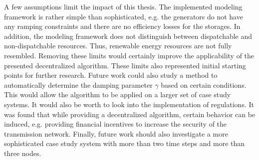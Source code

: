 A few assumptions limit the impact of this thesis. The implemented modeling framework is rather simple than sophisticated, e.g. the generators do not have any ramping constraints and there are no efficiency losses for the storages. In addition, the modeling framework does not distinguish between dispatchable and non-dispatchable resources. Thus, renewable energy resources are not fully resembled. Removing these limits would certainly improve the applicability of the presented decentralized algorithm. These limits also represented initial starting points for further research. Future work could also study a method to automatically determine the damping parameter $\gamma$ based on certain conditions. This would allow the algorithm to be applied on a larger set of case study systems. It would also be worth to look into the implementation of regulations. It was found that while providing a decentralized algorithm, certain behavior can be induced, e.g. providing financial incentives to increase the security of the transmission network. Finally, future work should also investigate a more sophisticated case study system with more than two time steps and more than three nodes.